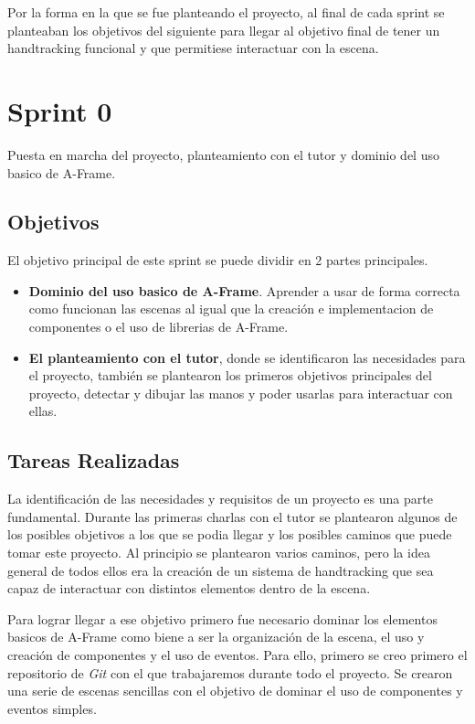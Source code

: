 \documentclass[a4paper, 12pt]{book}
\begin{document}
Por la forma en la que se fue planteando el proyecto, al final de cada sprint se planteaban los objetivos del siguiente para llegar al objetivo final de tener un handtracking funcional y que permitiese interactuar con la escena. 
\section{Sprint 0}
\label{sec:sprint0}
Puesta en marcha del proyecto, planteamiento con el tutor y dominio del uso basico de A-Frame.
\subsection{Objetivos}
\label{subsec:objetivo-principal0}
El objetivo principal de este sprint se puede dividir en 2 partes principales. 
\begin{itemize}
  \item \textbf{Dominio del uso basico de A-Frame}. Aprender a usar de forma correcta como funcionan las escenas al igual que la creación e implementacion de componentes o el uso de librerias de A-Frame.
  \item \textbf{El planteamiento con el tutor}, donde se identificaron las necesidades para el proyecto, también se plantearon los primeros objetivos principales del proyecto, detectar y dibujar las manos y poder usarlas para interactuar con ellas. 
\end{itemize}

\subsection{Tareas Realizadas}
\label{subsec:implementacion0}
La identificación de las necesidades y requisitos de un proyecto es una parte fundamental. Durante las primeras charlas con el tutor se plantearon algunos de los posibles objetivos a los que se podia llegar y los posibles caminos que puede tomar este proyecto. 
Al principio se plantearon varios caminos, pero la idea general de todos ellos era la creación de un sistema de handtracking que sea capaz de interactuar con distintos elementos dentro de la escena. 

Para lograr llegar a ese objetivo primero fue necesario dominar los elementos basicos de A-Frame como biene a ser la organización de la escena, el uso y creación de componentes y el uso de eventos. 
Para ello, primero se creo primero el repositorio de \textit{Git}  con el que trabajaremos durante todo el proyecto. Se crearon una serie de escenas sencillas con el objetivo de dominar el uso de componentes y eventos simples. 
\end{document}

